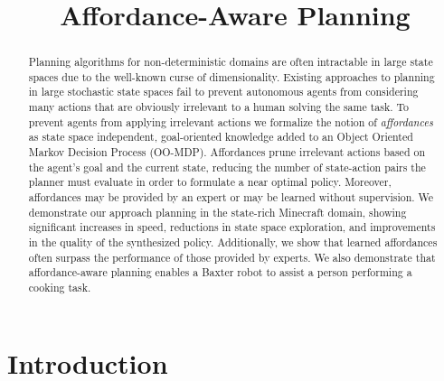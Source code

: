 \documentclass[letterpaper]{article}
\begin{document}
\title{Affordance-Aware Planning}


\maketitle

\begin{abstract}
Planning algorithms for non-deterministic domains are often
intractable in large state spaces due to the well-known curse of
dimensionality. Existing approaches to planning in large stochastic
state spaces fail to prevent autonomous agents from considering many
actions that are obviously irrelevant to a human solving the same
task. To prevent agents from applying irrelevant actions we formalize the notion of {\em affordances} as
state space independent, goal-oriented knowledge added to an Object Oriented Markov Decision
Process (OO-MDP).  Affordances prune irrelevant actions based on the agent's goal and
the current state, reducing the number of state-action pairs
the planner must evaluate in order to formulate a near optimal
policy. Moreover, affordances may be provided by an expert or may be learned without supervision.
We demonstrate our approach planning in the state-rich Minecraft domain, showing significant increases in
speed, reductions in state space exploration, and improvements in the quality of the synthesized policy.
Additionally, we show that learned affordances often surpass the
performance of those provided by experts. We also demonstrate that
affordance-aware planning enables a Baxter robot to assist a person performing a cooking task.
\end{abstract}


\section{Introduction}
\label{sec:introduction}
\end{document}
